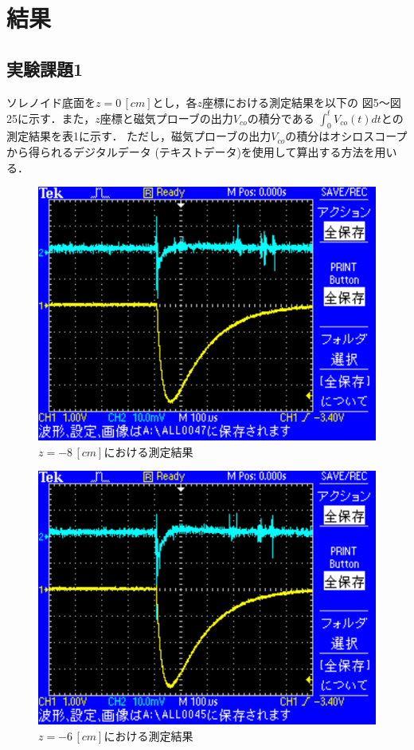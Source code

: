 
\section{結果}

\subsection{実験課題1}
ソレノイド底面を$z=0\,[\si{cm}]$とし，各$z$座標における測定結果を以下の
図5～図25に示す．また，$z$座標と磁気プローブの出力$V_{co}$の積分である
$\int_{0}^{t}V_{co}(t)dt$との測定結果を表1に示す．
ただし，磁気プローブの出力$V_{co}$の積分はオシロスコープから得られるデジタルデータ
(テキストデータ)を使用して算出する方法を用いる．

\begin{figure}[H]
    \centering
    \includegraphics[scale=0.5]{images-22.pdf}
    \caption{$z=-8\,[cm]$における測定結果}
\end{figure}

\begin{figure}[H]
    \centering
    \includegraphics[scale=0.5]{images-21.pdf}
    \caption{$z=-6\,[cm]$における測定結果}
\end{figure}

